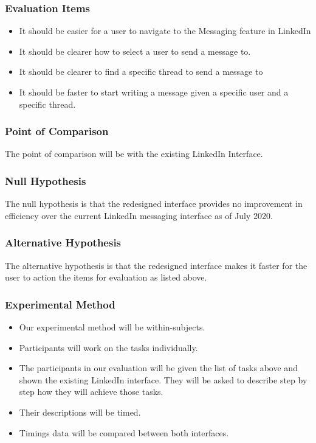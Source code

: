 \documentclass[
	letterpaper, %
]{jdf}
\begin{document}
\subsubsection{Evaluation Items}
\begin{itemize}
    \item It should be easier for a user to navigate to the Messaging feature in LinkedIn
    \item It should be clearer how to select a user to send a message to.
    \item It should be clearer to find a specific thread to send a message to
    \item It should be faster to start writing a message given a specific user and a specific thread.
\end{itemize}

\subsubsection{Point of Comparison}
The point of comparison will be with the existing LinkedIn Interface.

\subsubsection{Null Hypothesis}
The null hypothesis is that the redesigned interface provides no improvement in efficiency over the current LinkedIn messaging interface as of July 2020.

\subsubsection{Alternative Hypothesis}
The alternative hypothesis is that the redesigned interface makes it faster for the user to action the items for evaluation as listed above.

\subsubsection{Experimental Method}
\begin{itemize}
    \item Our experimental method will be within-subjects. 
    \item Participants will work on the tasks individually.
    \item The participants in our evaluation will be given the list of tasks above and shown the existing LinkedIn interface. They will be asked to describe step by step how they will achieve those tasks. 
    \item Their descriptions will be timed. 
    \item Timings data will be compared between both interfaces.
\end{itemize}
\end{document}
